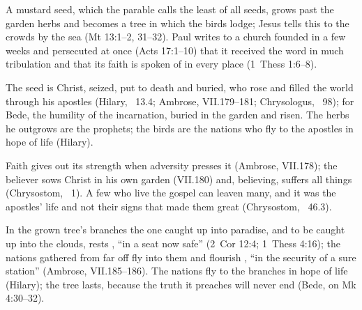 \begin{fourSenses}
\item[Literal.] A mustard seed, which the parable calls the least of all
seeds, grows past the garden herbs and becomes a tree in which the birds
lodge; Jesus tells this to the crowds by the sea (Mt 13:1--2, 31--32). Paul
writes to a church founded in a few weeks and persecuted at once (Acts
17:1--10) that it received the word in much tribulation and that its faith is spoken of in every place (1~Thess
1:6--8).
\item[Allegorical.] The seed is Christ, seized, put to death and buried, who
rose and filled the world through his apostles (Hilary, ~13.4; Ambrose, VII.179--181; Chrysologus, ~98); for
Bede, the humility of the incarnation, buried in the garden and risen. The
herbs he outgrows are the prophets; the birds are the nations who fly to the
apostles in hope of life (Hilary).
\item[Moral.] Faith gives out its strength when adversity presses it
(Ambrose, VII.178); the believer sows Christ in his own garden (VII.180) and,
believing, suffers all things (Chrysostom, ~1). A few
who live the gospel can leaven many, and it was the apostles' life and not
their signs that made them great (Chrysostom, ~46.3).
\item[Anagogical.] In the grown tree's branches the one caught up into
paradise, and to be caught up into the clouds, rests ,
``in a seat now safe'' (2~Cor 12:4; 1~Thess 4:16); the nations gathered from
far off fly into them and flourish ,
``in the security of a sure station'' (Ambrose, VII.185--186). The nations
fly to the branches in hope of life (Hilary); the tree lasts, because the
truth it preaches will never end (Bede, on Mk 4:30--32).
\end{fourSenses}
